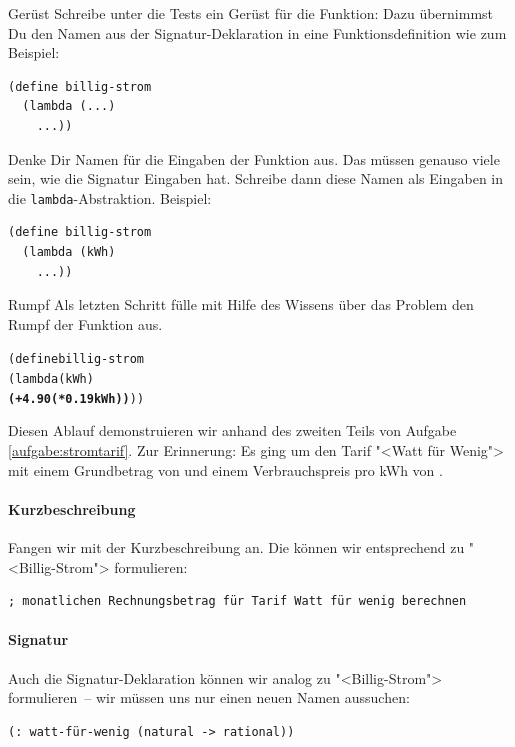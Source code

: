 \begin{konstruktionsanleitung}{Gerüst}
  \label{ka:geruest}
  Schreibe unter die Tests ein Gerüst für die Funktion: Dazu
  übernimmst Du den Namen aus der Signatur-Deklaration in eine
  Funktionsdefinition wie zum Beispiel:
\begin{verbatim}
(define billig-strom
  (lambda (...)
    ...))
\end{verbatim}
  Denke Dir Namen für die Eingaben der Funktion aus.  Das müssen
  genauso viele sein, wie die Signatur Eingaben hat.  Schreibe dann
  diese Namen als Eingaben in die \texttt{lambda}-Abstraktion.
  Beispiel:
  \begin{verbatim}
(define billig-strom
  (lambda (kWh)
    ...))
\end{verbatim}
\end{konstruktionsanleitung}

\begin{konstruktionsanleitung}{Rumpf}
  \label{ka:rumpf}
  Als letzten Schritt fülle mit Hilfe des Wissens über das Problem
  den Rumpf der Funktion aus.
\begin{alltt}
(define billig-strom
  (lambda (kWh)
    \textbf{(+ 4.90 (* 0.19 kWh))}))
\end{alltt}
\end{konstruktionsanleitung}

Diesen Ablauf demonstruieren wir anhand des zweiten Teils von Aufgabe~
\ref{aufgabe:stromtarif}.  Zur Erinnerung:  Es ging um den Tarif
"<Watt für Wenig"> mit einem Grundbetrag von  und einem
Verbrauchspreis pro kWh von .

\paragraph{Kurzbeschreibung}

Fangen wir mit der Kurzbeschreibung an.  Die können wir entsprechend
zu "<Billig-Strom"> formulieren:
\begin{verbatim}
; monatlichen Rechnungsbetrag für Tarif Watt für wenig berechnen
\end{verbatim}

\paragraph{Signatur}

Auch die Signatur-Deklaration können wir analog zu "<Billig-Strom">
formulieren~-- wir müssen uns nur einen neuen Namen aussuchen:
%
\begin{verbatim}
(: watt-für-wenig (natural -> rational))
\end{verbatim}

